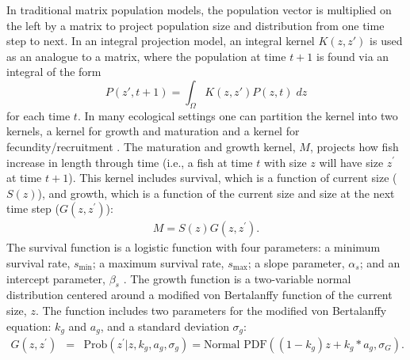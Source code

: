 \documentclass{article}[12pt]
\begin{document}
In traditional matrix population models, the population vector is multiplied on the left by a matrix to project population size and distribution from one time step to next.  In an integral projection model, an integral kernel \(K(z,z')\) is used as an analogue to a matrix, where the population at time \(t+1\) is found via an integral of the form
\begin{equation*}
P(z', t+1) = \int_{\Omega} K(z, z')P(z, t) \; dz
\end{equation*}
for each time \(t\).  In many ecological settings one can partition the kernel into two kernels, a kernel for growth and maturation and a kernel for fecundity/recruitment \citep{ellner2006integral}.  The maturation and growth kernel, \(M\), projects how fish increase in length through time (i.e., a fish at time \(t\) with size \(z\) will have size \(z^\prime\) at time \(t+1\)).
This kernel includes survival, which is a function of current size (\(S(z)\)), and 
growth, which is a function of the current size and size at the next time step (\(G(z, z^\prime)\)):
\begin{eqnarray}
M = S(z) G(z, z^\prime).
\end{eqnarray}
The survival function is a logistic function with four parameters: 
a minimum survival rate, \(s_\text{min}\); 
a maximum survival rate, \(s_\text{max}\);
a slope parameter, \(\alpha_s\); and 
an intercept parameter, \(\beta_s\) \citep{bolker2008ecological}.
The growth function is a two-variable normal distribution centered around a modified von Bertalanffy function of the current size, \(z\).
The function includes two parameters for the modified von Bertalanffy equation: \(k_g\) and \(a_g\), and a standard deviation \(\sigma_g\):
\begin{eqnarray}
G(z, z^\prime) &=&  \text{Prob}(z^\prime | z, k_g, a_g, \sigma_g) = \text{Normal PDF}((1 - k_g) z + k_g * a_g , \sigma_G).\label{eqn:Growth}
\end{eqnarray}
\end{document}
